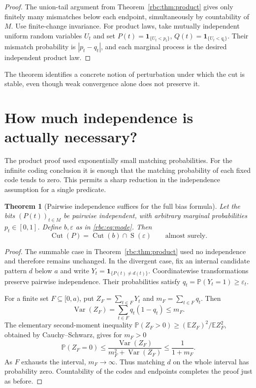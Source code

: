 \documentclass[11pt]{article}
\numberwithin{equation}{section}
\newtheorem{theorem}{Theorem}[section]
\theoremstyle{definition}
\theoremstyle{remark}
\newcommand{\Cut}{\operatorname{Cut}}
\newcommand{\SumCut}{\operatorname{S}}
\newcommand{\Prob}{\mathbb P}
\newcommand{\ind}{\mathbf 1}
\begin{document}
\begin{proof}
The union-tail argument from Theorem~\ref{rbc:thm:product} gives only finitely
many mismatches below each endpoint, simultaneously by countability of
$M$. Use finite-change invariance. For product laws, take mutually
independent uniform random variables $U_t$ and set
$P(t)=\ind_{\{U_t<p_t\}}$, $Q(t)=\ind_{\{U_t<q_t\}}$. Their mismatch
probability is $|p_t-q_t|$, and each marginal process is the desired
independent product law.
\end{proof}

The theorem identifies a concrete notion of perturbation under which the
cut is stable, even though weak convergence alone does not preserve it.




\section{How much independence is actually necessary?}
\label{rbc:sec:dependence}

The product proof used exponentially small matching probabilities. For the
infinite coding conclusion it is enough that the matching probability of
each fixed code tends to zero. This permits a sharp reduction in the
independence assumption for a single predicate.

\begin{theorem}[Pairwise independence suffices for the full bias formula]
\label{rbc:thm:pairwise-cut}
Let the bits $(P(t))_{t\in M}$ be pairwise independent, with arbitrary
marginal probabilities $p_t\in[0,1]$. Define $b,\varepsilon$ as in
\eqref{rbc:eq:mode}. Then
\begin{equation}
 \Cut(P)=\Cut(b)\cap\SumCut(\varepsilon)
 \qquad\text{almost surely}.
\label{rbc:eq:pairwise-main}
\end{equation}
\end{theorem}

\begin{proof}
The summable case in Theorem~\ref{rbc:thm:product} used no independence and
therefore remains unchanged. In the divergent case, fix an internal
candidate pattern $d$ below $a$ and write
$Y_t=\ind_{\{P(t)\ne d(t)\}}$. Coordinatewise transformations preserve
pairwise independence. Their probabilities satisfy
$q_t=\Prob(Y_t=1)\ge\varepsilon_t$.

For a finite set $F\subseteq[0,a)$, put
$Z_F=\sum_{t\in F}Y_t$ and $m_F=\sum_{t\in F}q_t$. Then
\[
 \operatorname{Var}(Z_F)=\sum_{t\in F}q_t(1-q_t)\le m_F.
\]
The elementary second-moment inequality
$\Prob(Z_F>0)\ge(\mathbb EZ_F)^2/\mathbb E Z_F^2$, obtained by
Cauchy--Schwarz, gives for $m_F>0$
\begin{equation}
 \Prob(Z_F=0)\le\frac{\operatorname{Var}(Z_F)}
                   {m_F^2+\operatorname{Var}(Z_F)}
               \le\frac{1}{1+m_F}.
\label{rbc:eq:pairwise-mismatch}
\end{equation}
As $F$ exhausts the interval, $m_F\to\infty$. Thus matching $d$ on the
whole interval has probability zero. Countability of the codes and
endpoints completes the proof just as before.
\end{proof}
\end{document}
